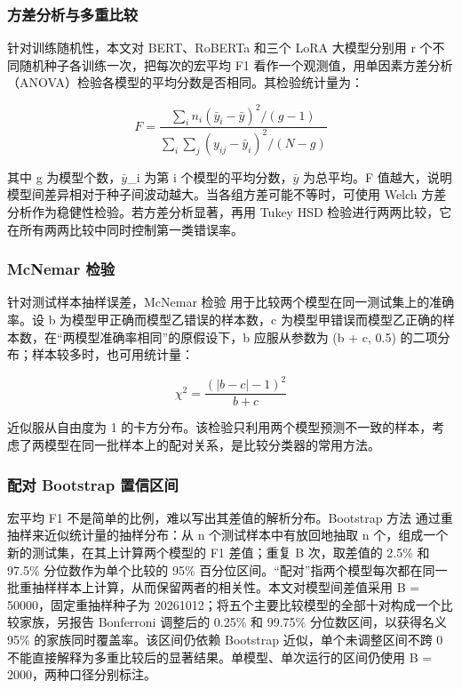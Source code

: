 \subsubsection{方差分析与多重比较}

针对训练随机性，本文对 BERT、RoBERTa 和三个 LoRA 大模型分别用 r 个不同随机种子各训练一次，把每次的宏平均 F1 看作一个观测值，用单因素方差分析（ANOVA）检验各模型的平均分数是否相同。其检验统计量为：

\begin{equation}F=\frac{\sum_i n_i(\bar y_i-\bar y)^2/(g-1)}{\sum_i\sum_j(y_{ij}-\bar y_i)^2/(N-g)}\tag{2-9}\label{eq:2-9}\end{equation}

其中 g 为模型个数，\(\bar y\)\_i 为第 i 个模型的平均分数，\(\bar y\) 为总平均。F 值越大，说明模型间差异相对于种子间波动越大。当各组方差可能不等时，可使用 Welch 方差分析作为稳健性检验。若方差分析显著，再用 Tukey HSD 检验进行两两比较，它在所有两两比较中同时控制第一类错误率。

\subsubsection{McNemar 检验}

针对测试样本抽样误差，McNemar 检验\cite{ref27} 用于比较两个模型在同一测试集上的准确率。设 b 为模型甲正确而模型乙错误的样本数，c 为模型甲错误而模型乙正确的样本数，在``两模型准确率相同''的原假设下，b 应服从参数为 (b + c, 0.5) 的二项分布；样本较多时，也可用统计量：

\begin{equation}\chi^2=\frac{(\lvert b-c\rvert-1)^2}{b+c}\tag{2-10}\label{eq:2-10}\end{equation}

近似服从自由度为 1 的卡方分布。该检验只利用两个模型预测不一致的样本，考虑了两模型在同一批样本上的配对关系，是比较分类器的常用方法\cite{ref21}。

\subsubsection{配对 Bootstrap 置信区间}

宏平均 F1 不是简单的比例，难以写出其差值的解析分布。Bootstrap 方法\cite{ref28} 通过重抽样来近似统计量的抽样分布：从 n 个测试样本中有放回地抽取 n 个，组成一个新的测试集，在其上计算两个模型的 F1 差值；重复 B 次，取差值的 2.5\% 和 97.5\% 分位数作为单个比较的 95\% 百分位区间。``配对''指两个模型每次都在同一批重抽样样本上计算，从而保留两者的相关性。本文对模型间差值采用 B = 50000，固定重抽样种子为 20261012；将五个主要比较模型的全部十对构成一个比较家族，另报告 Bonferroni 调整后的 0.25\% 和 99.75\% 分位数区间，以获得名义 95\% 的家族同时覆盖率。该区间仍依赖 Bootstrap 近似，单个未调整区间不跨 0 不能直接解释为多重比较后的显著结果。单模型、单次运行的区间仍使用 B = 2000，两种口径分别标注。

